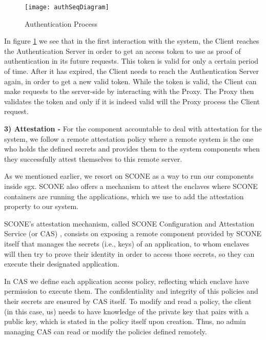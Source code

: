\vspace{3mm}

\begin{figure}[htbp]
	\centering
	{\texttt{[image: authSeqDiagram]}}
	\caption{Authentication Process}
	\label{fig:authProcess}
\end{figure}

In figure \ref{fig:authProcess} we see that in the first interaction with the system, the Client reaches the Authentication Server in order to get an access token to use as proof of authentication in its future requests. This token is valid for only a certain period of time. After it has expired, the Client needs to reach the Authentication Server again, in order to get a new valid token. While the token is valid, the Client can make requests to the server-side by interacting with the Proxy. The Proxy then validates the token and only if it is indeed valid will the Proxy process the Client request.

\vspace{5mm} 

\textbf{3) Attestation -}
For the component accountable to deal with attestation for the system, we follow a remote attestation policy where a remote system is the one who holds the defined secrets and provides them to the system components when they successfully attest themselves to this remote server.

As we mentioned earlier, we resort on SCONE as a way to run our components inside \gls{sgx}. SCONE also offers a mechanism to attest the enclaves where SCONE containers are running the applications, which we use to add the attestation property to our system. 

SCONE's attestation mechanism, called SCONE Configuration and Attestation Service (or CAS) \cite{sconeCAS}, consists on exposing a remote component provided by SCONE itself that manages the secrets (i.e., keys) of an application, to whom enclaves will then try to prove their identity in order to access those secrets, so they can execute their designated application. 

In CAS we define each application access policy, reflecting which enclave have permission to execute them. The confidentiality and integrity of this policies and their secrets are ensured by CAS itself. To modify and read a policy, the client (in this case, us) needs to have knowledge of the private key that pairs with a public key, which is stated in the policy itself upon creation. Thus, no admin managing CAS can read or modify the policies defined remotely.

